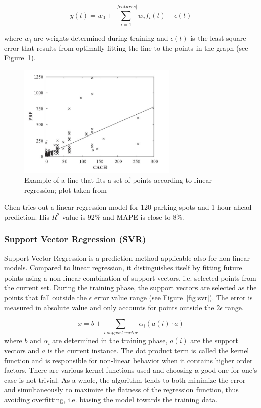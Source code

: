 \documentclass{article}
\begin{document}
$$y(t) = w_0 + \sum_{i=1}^{|features|}w_i f_i(t) + \epsilon(t)$$

where $w_i$ are weights determined during training and $\epsilon(t)$ is the least square error that results from optimally fitting the line to the points in the graph (see Figure~\ref{fig:linear-regression}).

\begin{figure}[!ht]
    \centering
    \includegraphics[width=3.0in]{linear-regression}
    \caption{Example of a line that fits a set of points according to linear regression; plot taken from \cite{Witten} }
    \label{fig:linear-regression}
\end{figure}


\vspace{2mm}
Chen\cite{Chen} tries out a linear regression model for 120 parking spots and 1 hour ahead prediction. His $R^2$ value is 92\% and MAPE is close to 8\%.

\subsubsection{Support Vector Regression (SVR)}
Support Vector Regression is a prediction method applicable also for non-linear models. Compared to linear regression, it distinguishes itself by fitting future points using a non-linear combination of support vectors, i.e. selected points from the current set. During the training phase, the support vectors are selected as the points that fall outside the $\epsilon$ error value range (see Figure~\ref{fig:svr}). The error is measured in absolute value and only accounts for points outside the $2\epsilon$ range. 

$$x = b + \sum_{i\:support\:vector} \alpha_i (a(i) \cdot a)  $$
where $b$ and $\alpha_i$ are determined in the training phase, $a(i)$ are the support vectors and $a$ is the current instance.  The dot product term is called the kernel function and is responsible for non-linear behavior when it contains higher order factors. There are various kernel functions used and choosing a good one for one's case is not trivial. As a whole, the algorithm tends to both minimize the error and simultaneously to maximize the flatness of the regression function, thus avoiding overfitting, i.e. biasing the model towards the training data.
\end{document}
